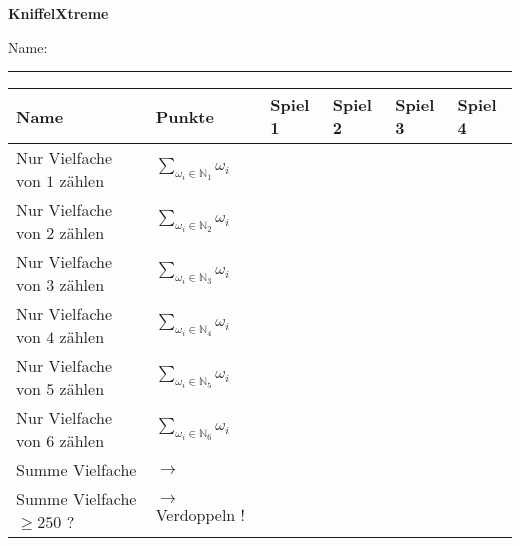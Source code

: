 \documentclass[a4paper,11pt]{exam}
\newcommand{\N} {\mathbb{N}}
\begin{document}
\begin{center}
    \Large\bf{KniffelXtreme}
\end{center}
\vspace{0.2cm}
\noindent \hspace{360pt} {Name: \rule{4cm}{0.2mm}} 
\vspace{0.2cm}
\renewcommand{\arraystretch}{1.3}
\begin{table}[h]
\begin{tabular}{|l|l|l|l|l|l|}
    \hline
    Name                      & Punkte                                            & Spiel 1 & Spiel 2 & Spiel 3 & Spiel 4 \\
    \hline
    Nur Vielfache von $1$ zählen & $\displaystyle\sum_{\omega_i \in \N_1} \omega_i$     &         &         &         &         \\
    \hline
    Nur Vielfache von $2$ zählen & $\displaystyle\sum_{\omega_i \in \N_2} \omega_i$     &         &         &         &         \\
    \hline
    Nur Vielfache von $3$ zählen & $\displaystyle\sum_{\omega_i \in \N_3} \omega_i$     &         &         &         &         \\
    \hline
    Nur Vielfache von $4$ zählen & $\displaystyle\sum_{\omega_i \in \N_4} \omega_i$     &         &         &         &         \\
    \hline
    Nur Vielfache von $5$ zählen & $\displaystyle\sum_{\omega_i \in \N_5} \omega_i$     &         &         &         &         \\
    \hline
    Nur Vielfache von $6$ zählen & $\displaystyle\sum_{\omega_i \in \N_6} \omega_i$     &         &         &         &         \\
    \hline\hline
    Summe Vielfache                    & $\longrightarrow $                                &         &         &         &         \\
    \hline
    Summe Vielfache $\geq 250$ \hspace{2pt}?         & $\rightarrow$  Verdoppeln !  &         &         &         &         \\ 
    \hline\hline


\end{tabular}
\end{table}
\end{document}
